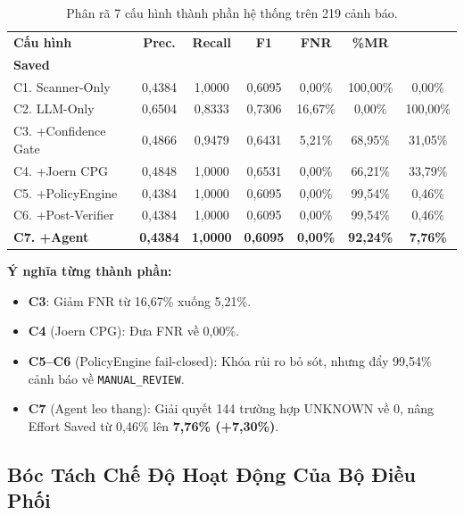 \documentclass[12pt, a4paper]{article}
\begin{document}
\begin{table}[H]
  \centering
  \caption{Phân rã 7 cấu hình thành phần hệ thống trên 219 cảnh báo.}
  \label{tab:ablation}
  \small
  \begin{tabular}{lcccccc}
    \toprule
    \textbf{Cấu hình} & \textbf{Prec.} & \textbf{Recall}
      & \textbf{F1} & \textbf{FNR}
      & \textbf{\%MR} & \makecell{\textbf{Effort}\\\textbf{Saved}} \\
    \midrule
    C1. Scanner-Only     & 0,4384 & 1,0000 & 0,6095 & 0,00\%
      & 100,00\% & 0,00\% \\
    C2. LLM-Only         & 0,6504 & 0,8333 & 0,7306
      & \textcolor{accentred}{16,67\%} & 0,00\% & 100,00\% \\
    C3. +Confidence Gate & 0,4866 & 0,9479 & 0,6431 & 5,21\%
      & 68,95\%  & 31,05\% \\
    C4. +Joern CPG       & 0,4848 & 1,0000 & 0,6531 & 0,00\%
      & 66,21\%  & 33,79\% \\
    C5. +PolicyEngine    & 0,4384 & 1,0000 & 0,6095 & 0,00\%
      & 99,54\%  & 0,46\%  \\
    C6. +Post-Verifier   & 0,4384 & 1,0000 & 0,6095 & 0,00\%
      & 99,54\%  & 0,46\%  \\
    \textbf{C7. +Agent}  & \textbf{0,4384} & \textbf{1,0000}
      & \textbf{0,6095} & \textbf{0,00\%}
      & \textbf{92,24\%} & \textbf{7,76\%} \\
    \bottomrule
  \end{tabular}
\end{table}

\noindent\textbf{Ý nghĩa từng thành phần:}
\begin{itemize}
  \item \textbf{C3}: Giảm FNR từ 16,67\% xuống 5,21\%.
  \item \textbf{C4} (Joern CPG): Đưa FNR về 0,00\%.
  \item \textbf{C5--C6} (PolicyEngine fail-closed): Khóa rủi ro bỏ sót,
        nhưng đẩy 99,54\% cảnh báo về \texttt{MANUAL\_REVIEW}.
  \item \textbf{C7} (Agent leo thang): Giải quyết 144 trường hợp UNKNOWN
        về 0, nâng Effort Saved từ 0,46\% lên \textbf{7,76\% (+7,30\%)}.
\end{itemize}

\subsection{Bóc Tách Chế Độ Hoạt Động Của Bộ Điều Phối}
\end{document}
